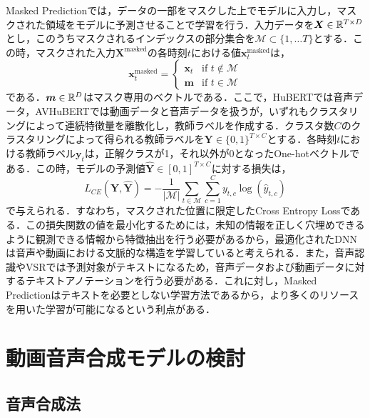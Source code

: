\documentclass[12pt]{jarticle}
\numberwithin{equation}{section}    %
\numberwithin{figure}{section}      %
\numberwithin{table}{section}      %
\begin{document}
Masked Predictionでは，データの一部をマスクした上でモデルに入力し，マスクされた領域をモデルに予測させることで学習を行う．入力データを$\bm{X} \in \mathbb{R}^{T \times D}$とし，このうちマスクされるインデックスの部分集合を$\mathcal{M} \subset \{ 1, \ldots T \}$とする．この時，マスクされた入力$\bm{X}^{\text{masked}}$の各時刻$t$における値$\bm{x}^{\text{masked}}_{t}$は，
\begin{equation}
    \bm{x}^{\text{masked}}_{t} =
    \begin{cases}
        \bm{x}_{t} & \text{if $t \notin \mathcal{M}$} \\
        \bm{m}     & \text{if $t \in \mathcal{M}$}
    \end{cases}
\end{equation}
である．$\bm{m} \in \mathbb{R}^{D}$はマスク専用のベクトルである．ここで，HuBERTでは音声データ，AVHuBERTでは動画データと音声データを扱うが，いずれもクラスタリングによって連続特徴量を離散化し，教師ラベルを作成する．クラスタ数$C$のクラスタリングによって得られる教師ラベルを$\bm{Y} \in \{0, 1\}^{T \times C}$とする．各時刻$t$における教師ラベル$\bm{y}_{t}$は，正解クラスが1，それ以外が0となったOne-hotベクトルである．この時，モデルの予測値$\hat{\bm{Y}} \in [0, 1]^{T \times C}$に対する損失は，
\begin{equation}
    L_{CE}(\bm{Y}, \hat{\bm{Y}}) =
    - \frac{1}{|\mathcal{M}|} \sum_{t \in \mathcal{M}} \sum_{c = 1}^{C} y_{t, c} \log (\hat{y}_{t, c})
\end{equation}
で与えられる．すなわち，マスクされた位置に限定したCross Entropy Lossである．この損失関数の値を最小化するためには，未知の情報を正しく穴埋めできるように観測できる情報から特徴抽出を行う必要があるから，最適化されたDNNは音声や動画における文脈的な構造を学習していると考えられる．また，音声認識やVSRでは予測対象がテキストになるため，音声データおよび動画データに対するテキストアノテーションを行う必要がある．これに対し，Masked Predictionはテキストを必要としない学習方法であるから，より多くのリソースを用いた学習が可能になるという利点がある．

\clearpage

\section{動画音声合成モデルの検討}
\subsection{音声合成法}
\end{document}

